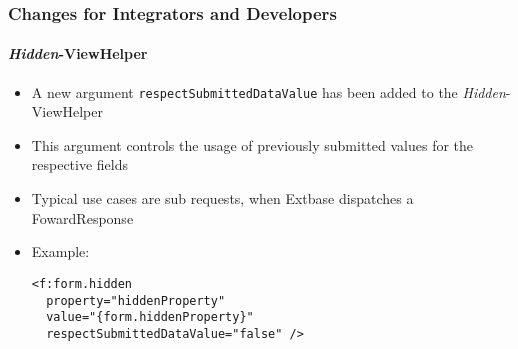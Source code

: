 %

\begin{frame}[fragile]
	\frametitle{Changes for Integrators and Developers}
	\framesubtitle{\textit{Hidden}-ViewHelper}


	\begin{itemize}
		\item A new argument \texttt{respectSubmittedDataValue} has been added
			to the \textit{Hidden}-ViewHelper
		\item This argument controls the usage of previously submitted values
			for the respective fields
		\item Typical use cases are sub requests, when Extbase dispatches a
			FowardResponse

		\item Example:
\begin{lstlisting}
<f:form.hidden
  property="hiddenProperty"
  value="{form.hiddenProperty}"
  respectSubmittedDataValue="false" />
\end{lstlisting}

	\end{itemize}
\end{frame}

